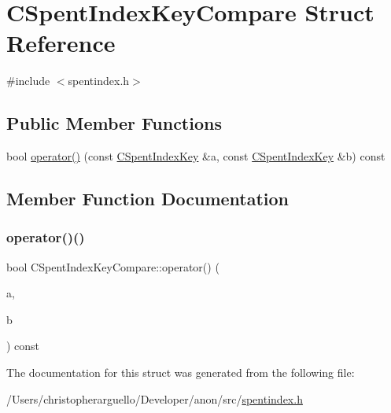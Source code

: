 \hypertarget{struct_c_spent_index_key_compare}{}\section{C\+Spent\+Index\+Key\+Compare Struct Reference}
\label{struct_c_spent_index_key_compare}


{\ttfamily \#include $<$spentindex.\+h$>$}

\subsection*{Public Member Functions}
\begin{DoxyCompactItemize}
\item 
bool \mbox{\hyperlink{struct_c_spent_index_key_compare_a64b75193a523be2b351cd8e382bcef41}{operator()}} (const \mbox{\hyperlink{struct_c_spent_index_key}{C\+Spent\+Index\+Key}} \&a, const \mbox{\hyperlink{struct_c_spent_index_key}{C\+Spent\+Index\+Key}} \&b) const
\end{DoxyCompactItemize}


\subsection{Member Function Documentation}
\mbox{\label{struct_c_spent_index_key_compare_a64b75193a523be2b351cd8e382bcef41}} 
\subsubsection{\texorpdfstring{operator()()}{operator()()}}
{\footnotesize\ttfamily bool C\+Spent\+Index\+Key\+Compare\+::operator() (\begin{DoxyParamCaption}\item[{const \mbox{\hyperlink{struct_c_spent_index_key}{C\+Spent\+Index\+Key}} \&}]{a,  }\item[{const \mbox{\hyperlink{struct_c_spent_index_key}{C\+Spent\+Index\+Key}} \&}]{b }\end{DoxyParamCaption}) const\hspace{0.3cm}{\ttfamily [inline]}}



The documentation for this struct was generated from the following file\+:\begin{DoxyCompactItemize}
\item 
/\+Users/christopherarguello/\+Developer/anon/src/\mbox{\hyperlink{spentindex_8h}{spentindex.\+h}}\end{DoxyCompactItemize}
